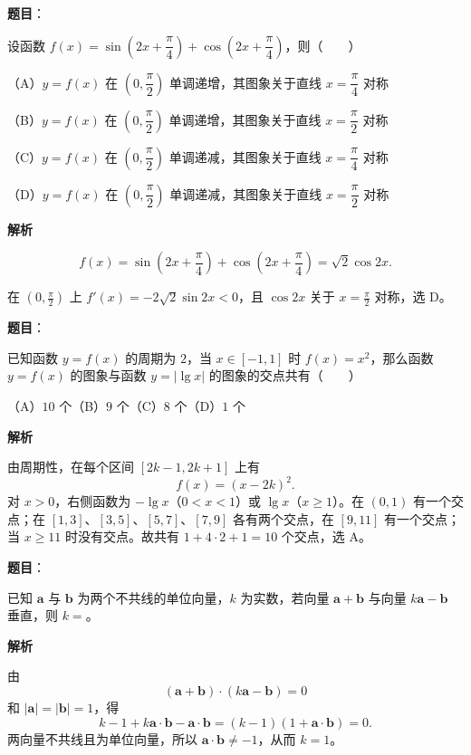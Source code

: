 \begin{answer}

\textbf{题目}：

设函数 $f(x)=\sin\left(2x+\dfrac\pi4\right)+\cos\left(2x+\dfrac\pi4\right)$，则\mbox{（　　）}

（A）$y=f(x)$ 在 $\left(0,\dfrac\pi2\right)$ 单调递增，其图象关于直线 $x=\dfrac\pi4$ 对称

（B）$y=f(x)$ 在 $\left(0,\dfrac\pi2\right)$ 单调递增，其图象关于直线 $x=\dfrac\pi2$ 对称

（C）$y=f(x)$ 在 $\left(0,\dfrac\pi2\right)$ 单调递减，其图象关于直线 $x=\dfrac\pi4$ 对称

（D）$y=f(x)$ 在 $\left(0,\dfrac\pi2\right)$ 单调递减，其图象关于直线 $x=\dfrac\pi2$ 对称

\textbf{解析}

\nopagebreak[4]
\[
f(x)=\sin\left(2x+\frac\pi4\right)
+\cos\left(2x+\frac\pi4\right)
=\sqrt2\cos2x.
\]

在 $\left(0,\frac\pi2\right)$ 上
$f'(x)=-2\sqrt2\sin2x<0$，且
$\cos2x$ 关于 $x=\frac\pi2$ 对称，选 D。


\end{answer}
\begin{answer}

\textbf{题目}：

已知函数 $y=f(x)$ 的周期为 $2$，当 $x\in[-1,1]$ 时 $f(x)=x^2$，那么函数 $y=f(x)$ 的图象与函数 $y=|\lg x|$ 的图象的交点共有\mbox{（　　）}

（A）$10$ 个\quad（B）$9$ 个\quad（C）$8$ 个\quad（D）$1$ 个

\textbf{解析}

由周期性，在每个区间 $[2k-1,2k+1]$ 上有
\nopagebreak[4]
\[
f(x)=(x-2k)^2.
\]
对 $x>0$，右侧函数为 $-\lg x$（$0<x<1$）或
$\lg x$（$x\geq1$）。在 $(0,1)$ 有一个交点；在
$[1,3]$、$[3,5]$、$[5,7]$、$[7,9]$ 各有两个交点，在
$[9,11]$ 有一个交点；当 $x\geq11$ 时没有交点。故共有
$1+4\cdot2+1=10$ 个交点，选 A。


\end{answer}
\begin{answer}

\textbf{题目}：

已知 $\boldsymbol a$ 与 $\boldsymbol b$ 为两个不共线的单位向量，$k$ 为实数，若向量 $\boldsymbol a+\boldsymbol b$ 与向量 $k\boldsymbol a-\boldsymbol b$ 垂直，则 $k=$\gkblank{}。

\textbf{解析}

由
\nopagebreak[4]
\[
(\boldsymbol a+\boldsymbol b)\cdot(k\boldsymbol a-\boldsymbol b)=0
\]
和 $|\boldsymbol a|=|\boldsymbol b|=1$，得
\nopagebreak[4]
\[
k-1+k\boldsymbol a\cdot\boldsymbol b-\boldsymbol a\cdot\boldsymbol b
=(k-1)(1+\boldsymbol a\cdot\boldsymbol b)=0.
\]
两向量不共线且为单位向量，所以
$\boldsymbol a\cdot\boldsymbol b\neq-1$，从而 $k=1$。


\end{answer}
